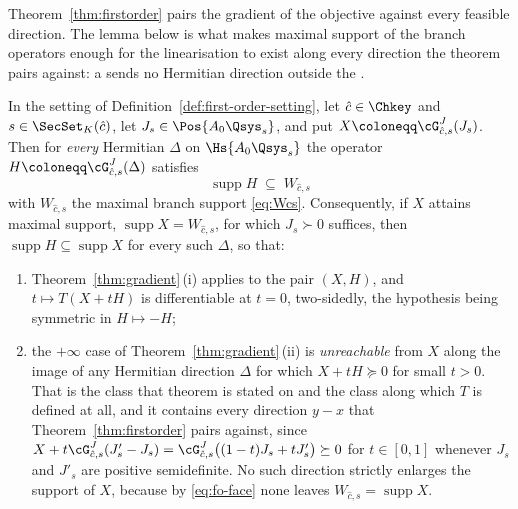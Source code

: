 
Theorem~\ref{thm:firstorder} pairs the gradient of the objective against
every feasible direction. The lemma below is what makes maximal support
of the branch operators enough for the linearisation to exist along every
direction the theorem pairs against: a  sends no
Hermitian direction outside the .

\begin{lemma}\label{lem:fo-face}
In the setting of Definition~\ref{def:first-order-setting}, let
$\hat c\in\Chkey$ and $s\in\SecSet_K(\hat c)$, let
$J_s\in\Pos{A_0\Qsys_s}$, and put $X\coloneqq\cG^{J}_{\hat c,s}(J_s)$.
Then for \emph{every} Hermitian $\Delta$ on $\Hs{A_0\Qsys_s}$ the
operator $H\coloneqq\cG^{J}_{\hat c,s}(\Delta)$ satisfies
\begin{equation}\label{eq:fo-face}
  \operatorname{supp}H\;\subseteq\;W_{\hat c,s}
\end{equation}
with $W_{\hat c,s}$ the maximal branch support \eqref{eq:Wcs}.
Consequently, if $X$ attains maximal support,
$\operatorname{supp}X=W_{\hat c,s}$, for which $J_s\succ0$ suffices,
then $\operatorname{supp}H\subseteq\operatorname{supp}X$ for every such
$\Delta$, so that:
\begin{enumerate}[label=(\alph*),leftmargin=2.2em]
\item Theorem~\ref{thm:gradient}\,(i) applies to the pair $(X,H)$, and
  $t\mapsto T(X+tH)$ is differentiable at $t=0$, two-sidedly, the
  hypothesis being symmetric in $H\mapsto-H$;
\item the $+\infty$ case of Theorem~\ref{thm:gradient}\,(ii) is
  \emph{unreachable} from $X$ along the image of any Hermitian direction
  $\Delta$ for which $X+t H\succeq0$ for small $t>0$. That is the class
  that theorem is stated on and the class along which $T$ is defined at
  all, and it contains every direction $y-x$ that
  Theorem~\ref{thm:firstorder} pairs against, since
  $X+t\cG^{J}_{\hat c,s}(J'_s-J_s)=\cG^{J}_{\hat c,s}\big((1-t)J_s+tJ'_s\big)
  \succeq0$ for $t\in[0,1]$ whenever $J_s$ and $J'_s$ are positive
  semidefinite. No such direction strictly enlarges the support of $X$,
  because by \eqref{eq:fo-face} none leaves
  $W_{\hat c,s}=\operatorname{supp}X$.
\end{enumerate}
\end{lemma}

